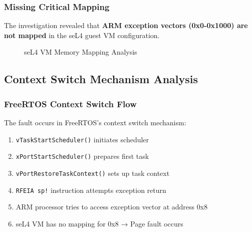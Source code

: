 \documentclass[11pt,a4paper]{article}
\begin{document}
\subsubsection{Missing Critical Mapping}

The investigation revealed that \textbf{ARM exception vectors (0x0-0x1000) are not mapped} in the seL4 guest VM configuration.

\begin{figure}[h]
\centering
{}
\caption{seL4 VM Memory Mapping Analysis}
\label{fig:memory_mapping}
\end{figure}

\subsection{Context Switch Mechanism Analysis}

\subsubsection{FreeRTOS Context Switch Flow}

The fault occurs in FreeRTOS's context switch mechanism:

\begin{enumerate}
    \item \texttt{vTaskStartScheduler()} initiates scheduler
    \item \texttt{xPortStartScheduler()} prepares first task
    \item \texttt{vPortRestoreTaskContext()} sets up task context
    \item \texttt{RFEIA sp!} instruction attempts exception return
    \item ARM processor tries to access exception vector at address 0x8
    \item seL4 VM has no mapping for 0x8 → Page fault occurs
\end{enumerate}
\end{document}
